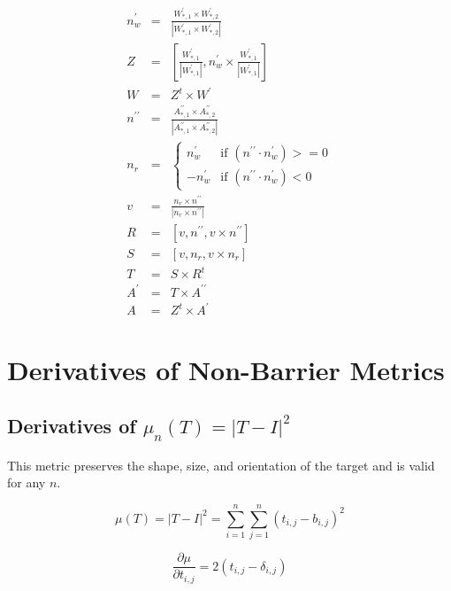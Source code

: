 \documentclass{report}
\begin{document}
\begin{eqnarray}
n^\prime_w &=& \frac{W^\prime_{*,1} \times W^\prime_{*,2}}
                   {|W^\prime_{*,1} \times W^\prime_{*,2}|} \\
Z &=& \left[ \frac{W^\prime_{*,1}}{|W^\prime_{*,1}|}, 
              n^\prime_w \times \frac{W^\prime_{*,1}}{|W^\prime_{*,1}|} \right] \\
W &=& Z^t \times W^\prime \\
n^{\prime\prime} &=& \frac{A^{\prime\prime}_{*,1} \times A^{\prime\prime}_{*,2}}
                       {|A^{\prime\prime}_{*,1} \times A^{\prime\prime}_{*,2}|} \\
n_r &=& \left\{ \begin{array}{ll} 
         n^\prime_w & \textrm{if $(n^{\prime\prime} \cdot n^\prime_w) >= 0$} \\
        -n^\prime_w & \textrm{if $(n^{\prime\prime} \cdot n^\prime_w) < 0$}
        \end{array} \right. \\
v &=& \frac{n_r \times n^{\prime\prime}}{|n_r \times n^{\prime\prime}|} \\
R &=& \left[ v, n^{\prime\prime}, v \times n^{\prime\prime} \right] \\
S &=& \left[ v, n_r, v \times n_r \right] \\
T &=& S \times R^t \\
A^\prime &=& T \times A^{\prime\prime} \\
A &=& Z^t \times A^\prime
\end{eqnarray}

\section{Derivatives of Non-Barrier Metrics}

\subsection{Derivatives of $\mu_n (T)=|T-I|^2$ \label{tmi}}

\noindent  This metric preserves the shape, size, and orientation of the target and is valid for any $n$. \newline

\begin{equation}
\mu(T) = |T-I|^2 = \sum_{i=1}^n \sum_{j=1}^n (t_{i,j} - b_{i,j})^2
\end{equation}

\begin{equation}
\frac{\partial \mu}{\partial t_{i,j}} = 2 (t_{i,j} - \delta_{i,j})
\end{equation}
\end{document}
